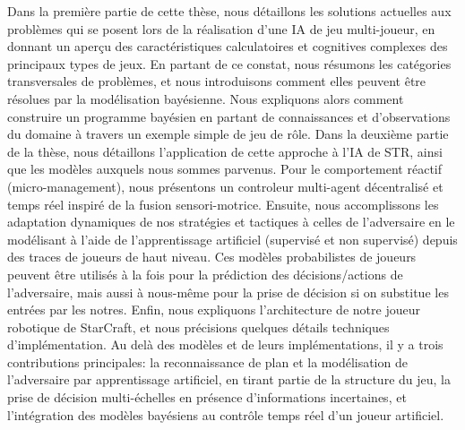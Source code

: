 Dans la première partie de cette thèse, nous détaillons les solutions actuelles aux problèmes qui se posent lors de la réalisation d'une IA de jeu multi-joueur, en donnant un aperçu des caractéristiques calculatoires et cognitives complexes des principaux types de jeux. En partant de ce constat, nous résumons les catégories transversales de problèmes, et nous introduisons comment elles peuvent être résolues par la modélisation bayésienne. Nous expliquons alors comment construire un programme bayésien en partant de connaissances et d'observations du domaine à travers un exemple simple de jeu de rôle. Dans la deuxième partie de la thèse, nous détaillons l'application de cette approche à l'IA de STR, ainsi que les modèles auxquels nous sommes parvenus. Pour le comportement réactif (micro-management), nous présentons un controleur multi-agent décentralisé et temps réel inspiré de la fusion sensori-motrice. Ensuite, nous accomplissons les adaptation dynamiques de nos stratégies et tactiques à celles de l'adversaire en le modélisant à l'aide de l'apprentissage artificiel (supervisé et non supervisé) depuis des traces de joueurs de haut niveau. Ces modèles probabilistes de joueurs peuvent être utilisés à la fois pour la prédiction des décisions/actions de l'adversaire, mais aussi à nous-même pour la prise de décision si on substitue les entrées par les notres. Enfin, nous expliquons l'architecture de notre joueur robotique de StarCraft, et nous précisions quelques détails techniques d'implémentation.
Au delà des modèles et de leurs implémentations, il y a trois contributions principales: la reconnaissance de plan et la modélisation de l'adversaire par apprentissage artificiel, en tirant partie de la structure du jeu, la prise de décision multi-échelles en présence d'informations incertaines, et l'intégration des modèles bayésiens au contrôle temps réel d'un joueur artificiel.

